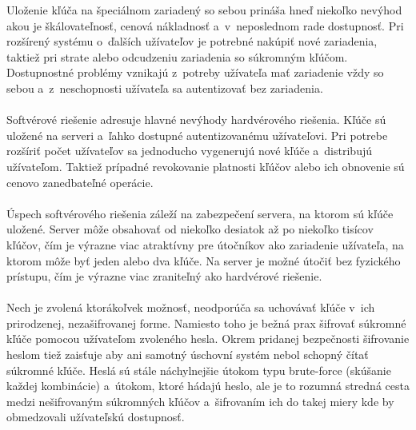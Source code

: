 \documentclass[
  digital, %
  table,   %
oneside,
  nolof,     %
  nolot,     %
]{fithesis3}
\begin{document}
Uloženie kľúča na špeciálnom zariadený so sebou prináša hneď niekoľko nevýhod akou je škálovateľnosť, cenová nákladnosť a~v~neposlednom rade dostupnosť. Pri rozšírený systému o~ďalších užívateľov je potrebné nakúpiť nové zariadenia, taktiež pri strate alebo odcudzeniu zariadenia so súkromným kľúčom. Dostupnostné problémy vznikajú z~potreby užívateľa mať zariadenie vždy so sebou a~z~neschopnosti užívateľa sa autentizovať bez zariadenia. \paragraph{} 
Softvérové riešenie adresuje hlavné nevýhody hardvérového riešenia. Kľúče sú uložené na serveri a~ľahko dostupné autentizovanému užívateľovi. Pri potrebe rozšíriť počet užívateľov sa jednoducho vygenerujú nové kľúče a~distribujú užívateľom. Taktiež prípadné revokovanie platnosti kľúčov alebo ich obnovenie sú cenovo zanedbateľné operácie. \paragraph{}
Úspech softvérového riešenia záleží na zabezpečení servera, na ktorom sú kľúče uložené. Server môže obsahovať od niekoľko desiatok až po niekoľko tisícov kľúčov, čím je výrazne viac atraktívny pre útočníkov ako zariadenie užívateľa, na ktorom môže byť jeden alebo dva kľúče. Na server je možné útočiť bez fyzického prístupu, čím je výrazne viac zraniteľný ako hardvérové riešenie. \paragraph{}

Nech je zvolená ktorákoľvek možnosť, neodporúča sa  uchovávať kľúče v~ich prirodzenej, nezašifrovanej forme. Namiesto toho je bežná prax šifrovať súkromné kľúče pomocou užívateľom zvoleného hesla. Okrem pridanej bezpečnosti šifrovanie heslom tiež zaisťuje aby ani samotný úschovní systém nebol schopný čítať súkromné kľúče. Heslá sú stále náchylnejšie útokom typu brute-force (skúšanie každej kombinácie) a~útokom, ktoré hádajú heslo, ale je to rozumná stredná cesta medzi nešifrovaným súkromných kľúčov a~šifrovaním ich do takej miery kde by obmedzovali užívateľskú dostupnosť. \paragraph{}   
 
\end{document}
